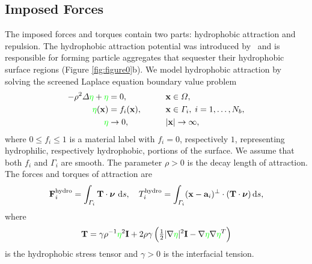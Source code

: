 \documentclass[lineno]{jfm}
\renewcommand{\aa}{\mathbf{a}}
\newcommand{\FF}{\mathbf{F}}
\newcommand{\nnu}{\boldsymbol{\nu}}
\newcommand{\xx}{\mathbf{x}}
\newcommand{\ReviewerTwo}[1]{\textcolor{green}{#1}}
\begin{document}
\subsection{Imposed Forces}
The imposed forces and torques contain two parts: hydrophobic attraction
and repulsion. The hydrophobic attraction potential was introduced
by~\cite{Fu20} and is responsible for forming particle aggregates that
sequester their hydrophobic surface regions (Figure \ref{fig:figure0}b).
We model hydrophobic attraction by solving the screened Laplace equation
boundary value problem
\begin{alignat}{2}
  \label{eq:SL}
-\rho^2 \Delta \ReviewerTwo{\eta} + \ReviewerTwo{\eta} &=0,            && \xx \in \Omega,\\
\label{eq:SLbc}
\ReviewerTwo{\eta}(\xx) &= f_i(\xx),\qquad  && \xx \in \Gamma_i,\; i=1,\ldots,N_b, \\
\label{eq:SLff}
\ReviewerTwo{\eta} &\to 0,                          &&|\xx| \to \infty,
\end{alignat}
where $0 \leq f_i \leq 1$ is a material label with $f_i = 0$,
respectively $1$, representing hydrophilic, respectively hydrophobic,
portions of the surface. We assume that both $f_i$ and $\Gamma_i$ are
smooth. The parameter $\rho > 0$ is the decay length of attraction. The
forces and torques of attraction are 
\begin{align}
  \label{eq:hydrophobicAttraction}
  \FF_i^{\text{hydro}} = \int_{\Gamma_i} {\bf T}\cdot \nnu \, \dif s, 
    \quad 
  T_i^{\text{hydro}} = \int_{\Gamma_i} (\xx - \aa_i)^{\perp} \cdot ({\bf T} \cdot \nnu) \dif s,
\end{align}
where
\begin{align}
  \label{eq:stress}
\mathbf{T}
= \gamma\rho^{-1}\ReviewerTwo{\eta}^2 \mathbf{I} + 2\rho\gamma \left(\tfrac{1}{2}|\nabla
  \ReviewerTwo{\eta}|^2 \mathbf{I} - \nabla \ReviewerTwo{\eta}  \nabla \ReviewerTwo{\eta}^T\right)
\end{align}
is the hydrophobic stress tensor and $\gamma > 0$ is
the interfacial
tension. 
\end{document}
